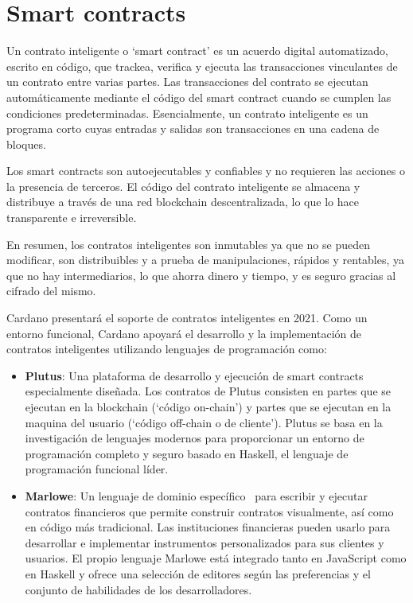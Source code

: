 \documentclass[12pt]{book}
\begin{document}
\section{Smart contracts}

Un contrato inteligente o `smart contract' es un acuerdo digital automatizado, escrito en código, que trackea, verifica y ejecuta las transacciones vinculantes de un contrato entre varias partes. Las transacciones del contrato se ejecutan automáticamente mediante el código del smart contract cuando se cumplen las condiciones predeterminadas. Esencialmente, un contrato inteligente es un programa corto cuyas entradas y salidas son transacciones en una cadena de bloques.

Los smart contracts son autoejecutables y confiables y no requieren las acciones o la presencia de terceros. El código del contrato inteligente se almacena y distribuye a través de una red blockchain descentralizada, lo que lo hace transparente e irreversible.

En resumen, los contratos inteligentes son inmutables ya que no se pueden modificar, son distribuibles y a prueba de manipulaciones, rápidos y rentables, ya que no hay intermediarios, lo que ahorra dinero y tiempo, y es seguro gracias al cifrado del mismo.

Cardano presentará el soporte de contratos inteligentes en 2021. Como un entorno funcional, Cardano apoyará el desarrollo y la implementación de contratos inteligentes utilizando lenguajes de programación como:

\begin{itemize}
    \item \textbf{Plutus}: Una plataforma de desarrollo y ejecución de smart contracts especialmente diseñada. 
    Los contratos de Plutus consisten en partes que se ejecutan en la blockchain (`código on-chain') y partes que se ejecutan en la maquina del usuario (`código off-chain o de cliente').
    Plutus se basa en la investigación de lenguajes modernos para proporcionar un entorno de programación completo y seguro basado en Haskell, el lenguaje de programación funcional líder.
    
    \item \textbf{Marlowe}: Un lenguaje de dominio específico~\cite{fowler2010dsl} para escribir y ejecutar contratos financieros que permite construir contratos visualmente, así como en código más tradicional. Las instituciones financieras pueden usarlo para desarrollar e implementar instrumentos personalizados para sus clientes y usuarios. El propio lenguaje Marlowe está integrado tanto en JavaScript como en Haskell y ofrece una selección de editores según las preferencias y el conjunto de habilidades de los desarrolladores.
\end{itemize}
\end{document}
